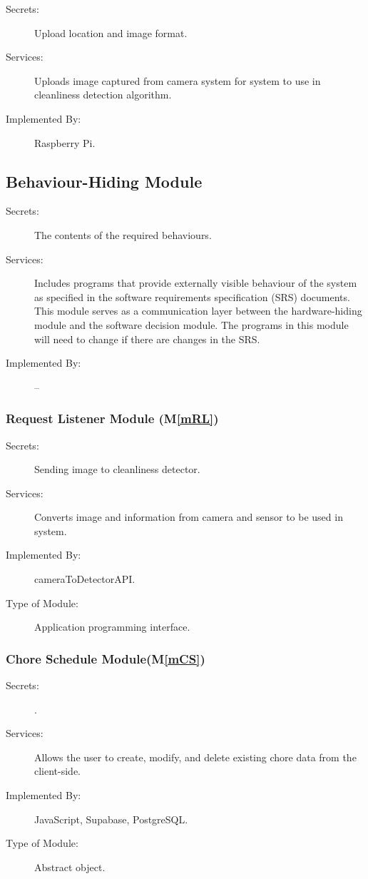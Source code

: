 \documentclass[12pt, titlepage]{article}
\newcommand{\mref}[1]{M\ref{#1}}
\begin{document}
\begin{description}
\item[Secrets:] Upload location and image format.
\item[Services:]Uploads image captured from camera system for system to use in cleanliness detection algorithm.
\item[Implemented By:] Raspberry Pi.
\end{description}

\subsection{Behaviour-Hiding Module}

\begin{description}
\item[Secrets:]The contents of the required behaviours.
\item[Services:]Includes programs that provide externally visible behaviour of
  the system as specified in the software requirements specification (SRS)
  documents. This module serves as a communication layer between the
  hardware-hiding module and the software decision module. The programs in this
  module will need to change if there are changes in the SRS.
\item[Implemented By:] --
\end{description}

\subsubsection{Request Listener Module (\mref{mRL})}

\begin{description}
\item[Secrets:]Sending image to cleanliness detector.
\item[Services:]Converts image and information from camera and sensor to be used in system.
\item[Implemented By:] cameraToDetectorAPI.
\item[Type of Module:] Application programming interface.
\end{description}

\subsubsection{Chore Schedule Module(\mref{mCS})}
\begin{description}
\item[Secrets:].
\item[Services:] Allows the user to create, modify, and delete existing chore data from the client-side.
\item[Implemented By:] JavaScript, Supabase, PostgreSQL.
\item[Type of Module:] Abstract object.
\end{description}
\end{document}
